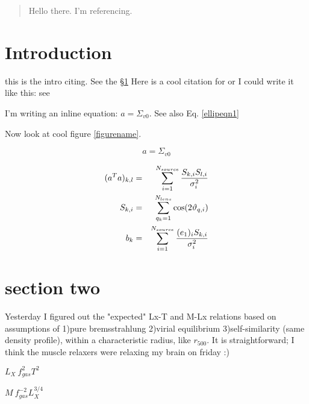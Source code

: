 \documentclass[preprint2]{aastex}
\begin{document}
\title{}

\author{Erin Scott Sheldon}


\begin{abstract}
Hello there. I'm referencing.
\end{abstract}

\keywords{}

\section{Introduction}\label{intro}
this is the intro citing.  See the  \S \ref{intro}  Here is
a cool citation for \citep{SR} or I could write it like this: see \cite{SR}

I'm writing an inline equation: $a = \Sigma_{v0}$.  See also Eq. \ref{ellipeqn1}

Now look at cool figure \ref{figurename}.

\begin{equation} \label{ellipeqn1}
a = \Sigma_{v0}
\end{equation}

\begin{eqnarray}
(a^{T}a)_{k,l} & = & {\sum_{i=1}^{N_{source}}{S_{k,i}S_{l,i} \over
\sigma_{i}^{2} } } \nonumber \\
S_{k,i} & = & {\sum_{q_k=1}^{N_{lens}}\cos(2\vartheta_{q,i})}  \\
b_k & = & \sum_{i=1}^{N_{source}}{(e_{1})_{i}S_{k,i} \over \sigma_{i}^{2}} \nonumber
\end{eqnarray}


\section{section two}

Yesterday I figured out the "expected" Lx-T and M-Lx relations based on
assumptions of 1)pure bremsstrahlung 2)virial equilibrium
3)self-similarity (same density profile), within a characteristic radius, 
like $r_{500}$. It is straightforward; I think the muscle relaxers       
were relaxing my brain on friday :)

$L_X ~ f_{gas}^2 T^2$

$M ~ f_{gas}^{-2} L_X^{3/4}$
\end{document}
